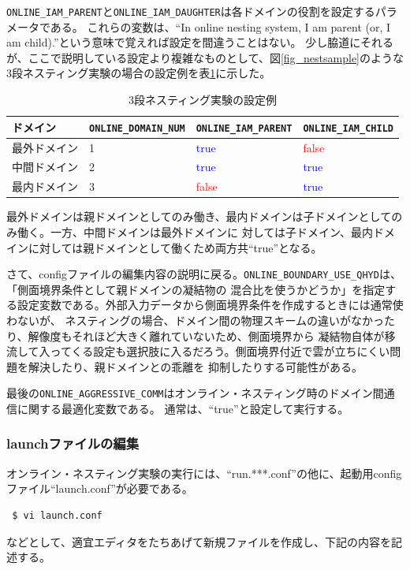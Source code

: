 \verb|ONLINE_IAM_PARENT|と\verb|ONLINE_IAM_DAUGHTER|は各ドメインの役割を設定するパラメータである。
これらの変数は、``In online nesting system, I am parent (or, I am child).''という意味で覚えれば設定を間違うことはない。
少し脇道にそれるが、ここで説明している設定より複雑なものとして、図\ref{fig_nestsample}のような
3段ネスティング実験の場合の設定例を表\ref{tab:triple_nested}に示した。

\begin{table}[htb]
\begin{center}
\caption{3段ネスティング実験の設定例}
\begin{tabularx}{150mm}{|l|l|l|X|} \hline
 \rowcolor[gray]{0.9} ドメイン & \verb|ONLINE_DOMAIN_NUM| & \verb|ONLINE_IAM_PARENT| & \verb|ONLINE_IAM_CHILD|\\ \hline
 最外ドメイン & 1 & \textcolor{blue}{true} & \textcolor{red}{false} \\ \hline
 中間ドメイン & 2 & \textcolor{blue}{true} & \textcolor{blue}{true} \\ \hline
 最内ドメイン & 3 & \textcolor{red}{false} & \textcolor{blue}{true} \\ \hline
\end{tabularx}
\label{tab:triple_nested}
\end{center}
\end{table}

\noindent 最外ドメインは親ドメインとしてのみ働き、最内ドメインは子ドメインとしてのみ働く。一方、中間ドメインは最外ドメインに
対しては子ドメイン、最内ドメインに対しては親ドメインとして働くため両方共``true''となる。

さて、configファイルの編集内容の説明に戻る。\verb|ONLINE_BOUNDARY_USE_QHYD|は、「側面境界条件として親ドメインの凝結物の
混合比を使うかどうか」を指定する設定変数である。外部入力データから側面境界条件を作成するときには通常使わないが、
ネスティングの場合、ドメイン間の物理スキームの違いがなかったり、解像度もそれほど大きく離れていないため、側面境界から
凝結物自体が移流して入ってくる設定も選択肢に入るだろう。側面境界付近で雲が立ちにくい問題を解決したり、親ドメインとの乖離を
抑制したりする可能性がある。

最後の\verb|ONLINE_AGGRESSIVE_COMM|はオンライン・ネスティング時のドメイン間通信に関する最適化変数である。
通常は、``true''と設定して実行する。


\subsubsection{launchファイルの編集}
オンライン・ネスティング実験の実行には、``run.***.conf''の他に、起動用configファイル``launch.conf''が必要である。
\begin{verbatim}
 $ vi launch.conf
\end{verbatim}
などとして、適宜エディタをたちあげて新規ファイルを作成し、下記の内容を記述する。\\

